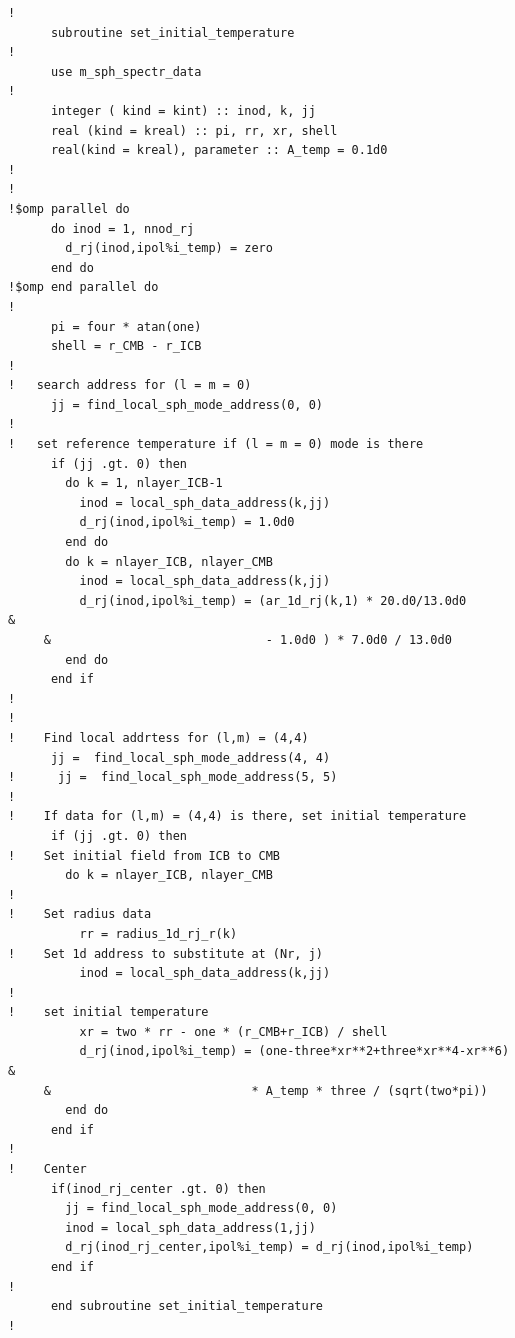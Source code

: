 %
\begin{verbatim}
!
      subroutine set_initial_temperature
!
      use m_sph_spectr_data
!
      integer ( kind = kint) :: inod, k, jj
      real (kind = kreal) :: pi, rr, xr, shell
      real(kind = kreal), parameter :: A_temp = 0.1d0
!
!
!$omp parallel do
      do inod = 1, nnod_rj
        d_rj(inod,ipol%i_temp) = zero
      end do
!$omp end parallel do
!
      pi = four * atan(one)
      shell = r_CMB - r_ICB
!
!   search address for (l = m = 0)
      jj = find_local_sph_mode_address(0, 0)
!
!   set reference temperature if (l = m = 0) mode is there
      if (jj .gt. 0) then
        do k = 1, nlayer_ICB-1
          inod = local_sph_data_address(k,jj)
          d_rj(inod,ipol%i_temp) = 1.0d0
        end do
        do k = nlayer_ICB, nlayer_CMB
          inod = local_sph_data_address(k,jj)
          d_rj(inod,ipol%i_temp) = (ar_1d_rj(k,1) * 20.d0/13.0d0        &
     &                              - 1.0d0 ) * 7.0d0 / 13.0d0
        end do
      end if
!
!
!    Find local addrtess for (l,m) = (4,4)
      jj =  find_local_sph_mode_address(4, 4)
!      jj =  find_local_sph_mode_address(5, 5)
!
!    If data for (l,m) = (4,4) is there, set initial temperature
      if (jj .gt. 0) then
!    Set initial field from ICB to CMB
        do k = nlayer_ICB, nlayer_CMB
!
!    Set radius data
          rr = radius_1d_rj_r(k)
!    Set 1d address to substitute at (Nr, j)
          inod = local_sph_data_address(k,jj)
!
!    set initial temperature
          xr = two * rr - one * (r_CMB+r_ICB) / shell
          d_rj(inod,ipol%i_temp) = (one-three*xr**2+three*xr**4-xr**6)  &
     &                            * A_temp * three / (sqrt(two*pi))
        end do
      end if
!
!    Center
      if(inod_rj_center .gt. 0) then
        jj = find_local_sph_mode_address(0, 0)
        inod = local_sph_data_address(1,jj)
        d_rj(inod_rj_center,ipol%i_temp) = d_rj(inod,ipol%i_temp)
      end if
!
      end subroutine set_initial_temperature
!
\end{verbatim}
%

